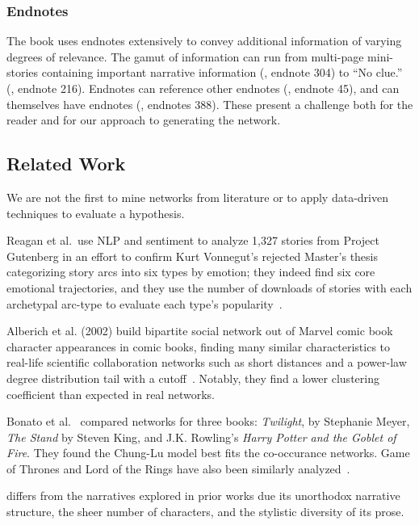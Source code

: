 \subsubsection{Endnotes}

The book uses endnotes extensively to convey additional information of varying degrees of relevance. The gamut of information can run from multi-page mini-stories containing important narrative information (\infinitejest, endnote 304) to ``No clue.'' (\infinitejest, endnote 216). Endnotes can reference other endnotes (\infinitejest, endnote 45), and can themselves have endnotes (\infinitejest, endnotes 388). These present a challenge both for the reader and for our approach to generating the network.

\subsection{Related Work}

We are not the first to mine networks from literature or to apply data-driven techniques to evaluate a hypothesis.

Reagan et al.\ use NLP and sentiment to analyze 1,327 stories from Project Gutenberg in an effort to confirm Kurt Vonnegut's rejected Master's thesis categorizing story arcs into six types by emotion; they indeed find six core emotional trajectories, and they use the number of downloads of stories with each archetypal arc-type to evaluate each type's popularity~\cite{Reagan2016}.

Alberich et al. (2002) build bipartite social network out of Marvel comic book character appearances in comic books, finding many similar characteristics to real-life scientific collaboration networks such as short distances and a power-law degree distribution tail with a cutoff~\cite{2002marvel}. Notably, they find a lower clustering coefficient than expected in real networks.

Bonato et al.~\cite{Bonato2016} compared networks for three books: \textit{Twilight}, by Stephanie Meyer, \textit{The Stand} by Steven King, and J.K. Rowling's \textit{Harry Potter and the Goblet of Fire}. They found the Chung-Lu model best fits the co-occurance networks. Game of Thrones and Lord of the Rings have also been similarly analyzed~\cite{GOT,ribeiro2016complex}.

\infinitejest differs from the narratives explored in prior works due its unorthodox narrative structure, the sheer number of characters, and the stylistic diversity of its prose.
